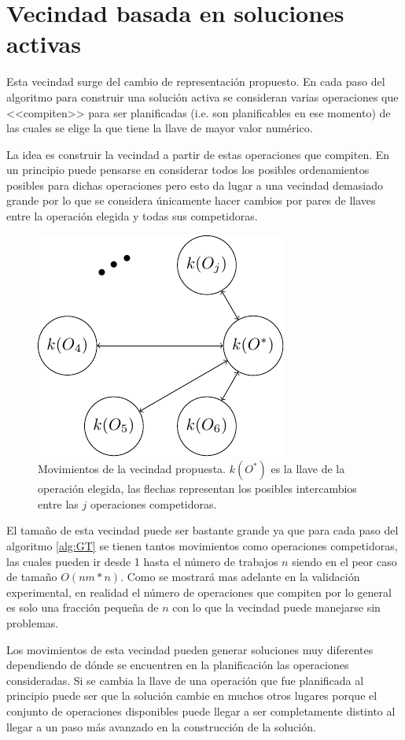 \section{Vecindad basada en soluciones activas}
Esta vecindad surge del cambio de representación propuesto. En cada paso del algoritmo para construir una solución activa se consideran varias operaciones que <<compiten>> para ser planificadas (i.e. son planificables en ese momento) de las cuales se elige la que tiene la llave de mayor valor numérico. 

La idea es construir la vecindad a partir de estas operaciones que compiten. En un principio puede pensarse en considerar todos los posibles ordenamientos posibles para dichas operaciones pero esto da lugar a una vecindad demasiado grande por lo que se considera únicamente hacer cambios por pares de llaves entre la operación elegida y todas sus competidoras.
\begin{figure}[H]
\centering
\includegraphics[scale=1.3]{Imagenes/vec2.pdf}
\caption{Movimientos de la vecindad propuesta. $k(O^*)$ es la llave de la operación elegida, las flechas representan los posibles intercambios entre las $j$ operaciones competidoras.}
\end{figure}

El tamaño de esta vecindad puede ser bastante grande ya que para cada paso del algoritmo \ref{alg:GT} se tienen tantos movimientos como operaciones competidoras, las cuales pueden ir desde 1 hasta el número de trabajos $n$ siendo en el peor caso de tamaño $O(nm*n)$. Como se mostrará mas adelante en la validación experimental, en realidad el número de operaciones que compiten por lo general es solo una fracción pequeña de $n$ con lo que la vecindad puede manejarse sin problemas.


Los movimientos de esta vecindad pueden generar soluciones muy diferentes dependiendo de dónde se encuentren en la planificación las operaciones consideradas. Si se cambia la llave de una operación que fue planificada al principio puede ser que la solución cambie en muchos otros lugares porque el conjunto de operaciones disponibles puede llegar a ser completamente distinto al llegar a un paso más avanzado en la construcción de la solución. 

